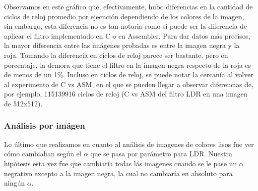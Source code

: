 \documentclass[a4paper]{article}
\begin{document}
\begin{figure}[!ht]
    \centering
    \begin{floatrow}
    \end{floatrow}
\end{figure}

Observamos en este gráfico que, efectivamente, hubo diferencias en la cantidad de ciclos de reloj promedio por ejecución dependiendo de los colores de la imagen,
sin embargo, esta diferencia no es tan notoria como sí puede ser la diferencia de aplicar el filtro implementado en C o en Assembler.
Para dar datos más precisos, la mayor diferencia entre las imágenes probadas es entre la imagen negra y la roja. Tomando la diferencia en ciclos de reloj
parece ser bastante, pero en porcentaje, la demora que tiene el filtro en la imagen negra respecto de la roja es de menos de un 1\%.
Incluso en ciclos de reloj, se puede notar la cercanía al volver al experimento de C vs ASM, en el que se pueden llegar a observar diferencias de, por ejemplo,
115139916 ciclos de reloj (C vs ASM del filtro LDR en una imagen de 512x512).

\subsubsection{Análisis por imágen}
Lo último que realizamos en cuanto al análisis de imagenes de colores lisos fue ver cómo cambiaban según el $\alpha$ que se pasa por parámetro
para LDR. Nuestra hipótesis esta vez fue que cambiaría todas lás imagenes cuando se le pase un $\alpha$ negrativo excepto a la imagen negra, la cual
no cambiaría en absoluto para ningún $\alpha$.
\end{document}
